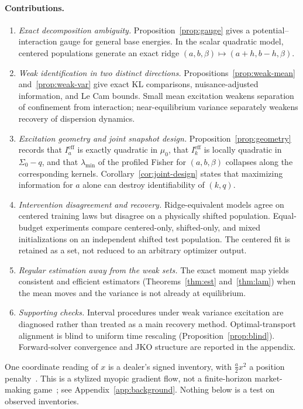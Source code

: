 \documentclass[anon,11pt]{alt2027}
\begin{document}
\paragraph{Contributions.}
\begin{enumerate}
\item \emph{Exact decomposition ambiguity.} Proposition~\ref{prop:gauge}
gives a potential--interaction gauge for general base energies. In the scalar
quadratic model, centered populations generate an exact ridge
$(a,b,\beta)\mapsto(a+h,b-h,\beta)$.
\item \emph{Weak identification in two distinct directions.}
Propositions~\ref{prop:weak-mean} and~\ref{prop:weak-var} give exact KL
comparisons, nuisance-adjusted information, and Le Cam bounds. Small mean
excitation weakens separation of confinement from interaction; near-equilibrium
variance separately weakens recovery of dispersion dynamics.
\item \emph{Excitation geometry and joint snapshot design.}
Proposition~\ref{prop:geometry} records that $I_a^{\mathrm{eff}}$ is exactly
quadratic in $\mu_0$, that $I_k^{\mathrm{eff}}$ is locally quadratic in
$\Sigma_0-q$, and that $\lambda_{\min}$ of the profiled Fisher for
$(a,b,\beta)$ collapses along the corresponding kernels. Corollary~\ref{cor:joint-design}
states that maximizing information for $a$ alone can destroy identifiability
of $(k,q)$.
\item \emph{Intervention disagreement and recovery.} Ridge-equivalent models
agree on centered training laws but disagree on a physically shifted
population. Equal-budget experiments compare centered-only, shifted-only, and
mixed initializations on an independent shifted test population. The centered
fit is retained as a set, not reduced to an arbitrary optimizer output.
\item \emph{Regular estimation away from the weak sets.} The exact moment map
yields consistent and efficient estimators (Theorems~\ref{thm:est}
and~\ref{thm:lam}) when the mean moves and the variance is not already at
equilibrium.
\item \emph{Supporting checks.} Interval procedures under weak variance
excitation are diagnosed rather than treated as a main recovery method.
Optimal-transport alignment is blind to uniform time rescaling
(Proposition~\ref{prop:blind}). Forward-solver convergence and JKO structure
are reported in the appendix.
\end{enumerate}

One coordinate reading of $x$ is a dealer's signed inventory, with
$\frac a2 x^2$ a position penalty~\cite{AvellanedaStoikov08,GueantLehalleFernandez2013}.
This is a stylized myopic gradient flow, not a finite-horizon market-making
game~\cite{LasryLions07,BaldacciBergaultPossamai2023}; see
Appendix~\ref{app:background}. Nothing below is a test on observed inventories.
\end{document}
